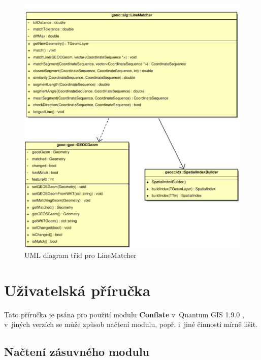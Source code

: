 \vspace{2cm}
  \begin{figure}[t]
    \centering
      \tiny
      \includegraphics[width=420pt]{./pictures/uml-lm.pdf}
      \caption{UML diagram tříd pro LineMatcher}
      \label{fig:uml-lm}
  \end{figure}

\chapter{Uživatelská příručka}
\label{priloha-prirucka}

Tato příručka je psána pro použití modulu \textbf{Conflate} v~Quantum GIS 1.9.0 , 
v~jiných verzích se může způsob načtení modulu, popř. i~jiné činnosti mírně lišit.

\section{Načtení zásuvného modulu}
\label{prirucka-nacteni}

